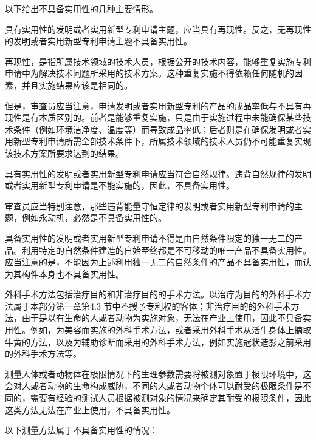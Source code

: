 以下给出不具备实用性的几种主要情形。

具有实用性的发明或者实用新型专利申请主题，应当具有再现性。反之，无再现性的发明或者实用新型专利申请主题不具备实用性。

再现性，是指所属技术领域的技术人员，根据公开的技术内容，能够重复实施专利申请中为解决技术问题所采用的技术方案。这种重复实施不得依赖任何随机的因素，并且实施结果应该是相同的。

但是，审查员应当注意，申请发明或者实用新型专利的产品的成品率低与不具有再现性是有本质区别的。前者是能够重复实施，只是由于实施过程中未能确保某些技术条件（例如环境洁净度、温度等）而导致成品率低；后者则是在确保发明或者实用新型专利申请所需全部技术条件下，所属技术领域的技术人员仍不可能重复实现该技术方案所要求达到的结果。

具有实用性的发明或者实用新型专利申请应当符合自然规律。违背自然规律的发明或者实用新型专利申请是不能实施的，因此，不具备实用性。

审查员应当特别注意，那些违背能量守恒定律的发明或者实用新型专利申请的主题，例如永动机，必然是不具备实用性的。

具备实用性的发明或者实用新型专利申请不得是由自然条件限定的独一无二的产品。利用特定的自然条件建造的自始至终都是不可移动的唯一产品不具备实用性。应当注意的是，不能因为上述利用独一无二的自然条件的产品不具备实用性，而认为其构件本身也不具备实用性。

外科手术方法包括治疗目的和非治疗目的的手术方法。以治疗为目的的外科手术方法属于本部分第一章第4.3 节中不授予专利权的客体；非治疗目的的外科手术方法，由于是以有生命的人或者动物为实施对象，无法在产业上使用，因此不具备实用性。例如，为美容而实施的外科手术方法，或者采用外科手术从活牛身体上摘取牛黄的方法，以及为辅助诊断而采用的外科手术方法，例如实施冠状造影之前采用的外科手术方法等。

测量人体或者动物体在极限情况下的生理参数需要将被测对象置于极限环境中，这会对人或者动物的生命构成威胁，不同的人或者动物个体可以耐受的极限条件是不同的，需要有经验的测试人员根据被测对象的情况来确定其耐受的极限条件，因此这类方法无法在产业上使用，不具备实用性。

以下测量方法属于不具备实用性的情况：

